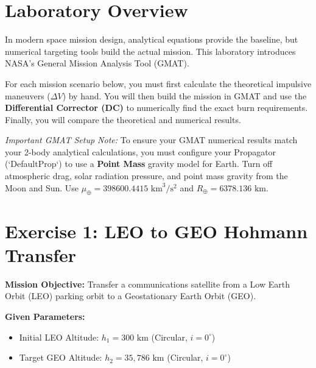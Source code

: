 \documentclass[11pt, letterpaper]{article}
\begin{document}
\section*{Laboratory Overview}
In modern space mission design, analytical equations provide the baseline, but numerical targeting tools build the actual mission. This laboratory introduces NASA's General Mission Analysis Tool (GMAT). 

For each mission scenario below, you must first calculate the theoretical impulsive maneuvers ($\Delta V$) by hand. You will then build the mission in GMAT and use the \textbf{Differential Corrector (DC)} to numerically find the exact burn requirements. Finally, you will compare the theoretical and numerical results.

\textit{Important GMAT Setup Note:} To ensure your GMAT numerical results match your 2-body analytical calculations, you must configure your Propagator (`DefaultProp`) to use a \textbf{Point Mass} gravity model for Earth. Turn off atmospheric drag, solar radiation pressure, and point mass gravity from the Moon and Sun. Use $\mu_{\oplus} = 398600.4415 \text{ km}^3/\text{s}^2$ and $R_{\oplus} = 6378.136 \text{ km}$.

\vspace{0.5cm}

\section*{Exercise 1: LEO to GEO Hohmann Transfer}
\textbf{Mission Objective:} Transfer a communications satellite from a Low Earth Orbit (LEO) parking orbit to a Geostationary Earth Orbit (GEO).

\textbf{Given Parameters:}
\begin{itemize}
    \item Initial LEO Altitude: $h_1 = 300 \text{ km}$ (Circular, $i = 0^\circ$)
    \item Target GEO Altitude: $h_2 = 35,786 \text{ km}$ (Circular, $i = 0^\circ$)
\end{itemize}
\end{document}
